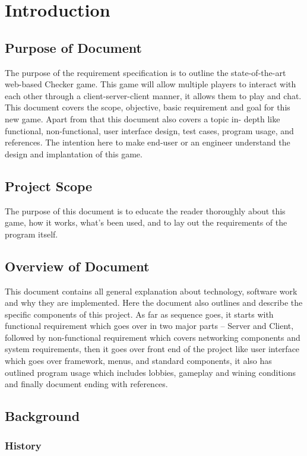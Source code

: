 \documentclass{scrreprt}
\begin{document}
\chapter{Introduction}

\section{Purpose of Document}
The purpose of the requirement specification is to outline the state-of-the-art
web-based Checker game. This game will allow multiple players to interact
with each other through a client-server-client manner, it allows them to play
and chat. This document covers the scope, objective, basic requirement and
goal for this new game. Apart from that this document also covers a topic in-
depth like functional, non-functional, user interface design, test cases,
program usage, and references. The intention here to make end-user or an
engineer understand the design and implantation of this game.

\section{Project Scope}
The purpose of this document is to educate the reader thoroughly about this
game, how it works, what’s been used, and to lay out the requirements of the program itself.

\section{Overview of Document}
This document contains all general explanation about technology, software
work and why they are implemented. Here the document also outlines and
describe the specific components of this project. As far as sequence goes, it
starts with functional requirement which goes over in two major parts –
Server and Client, followed by non-functional requirement which covers
networking components and system requirements, then it goes over front end
of the project like user interface which goes over framework, menus, and
standard components, it also has outlined program usage which includes
lobbies, gameplay and wining conditions and finally document ending with references.

\section{Background}

\subsection{History}
\end{document}
